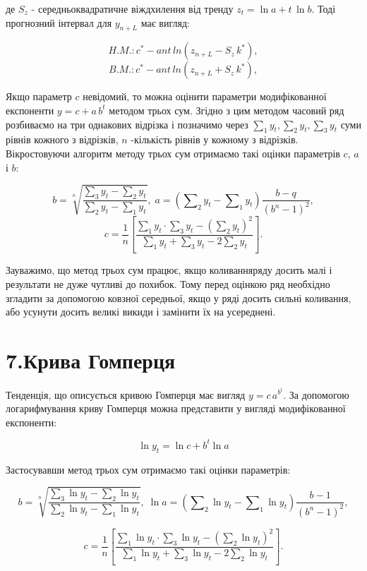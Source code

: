 \documentclass[a4paper, fontsize=10pt, oneside]{article}
\begin{document}
\noindent де $S_{z}$ - середньоквадратичне віждхилення від тренду $z_{t} = 	\ln{ a} + t\, \ln{b}.$
Тоді прогнозний інтервал для $y_{n+L}$ має вигляд:

$$H.M.: c^{*} - ant\,ln{(z_{n+L} - S_{z} \, k^{*})},$$
$$B.M.: c^{*} - ant\,ln{(z_{n+L} + S_{z} \, k^{*})},$$

Якщо параметр $c$ невідомий, то можна оцінити параметри модифікованної експоненти $y = c + a \, b^{t}$ методом трьох сум. Згідно з цим методом часовий ряд розбиваємо на три однакових відрізка і позначимо через $\sum_{1}y_{t}, \sum_{2}y_{t}, \sum_{3}y_{t}$ суми рівнів кожного з відрізків, $n$ -кількість рівнів у кожному з відрізків. Вікростовуючи алгоритм методу трьох сум отримаємо такі оцінки параметрів $c$, $a$ і $b$:

$$ b = \sqrt[n]{\frac{\sum_{3}y_{t} - \sum_{2}y_{t}}{\sum_{2}y_{t} - \sum_{1}y_{t}}},\; a = ( \sum\nolimits_{2} y_{t} - \sum\nolimits_{1} y_{t} ) \frac{b - q}{(b^{n} - 1)^2},$$
$$ c = \frac{1}{n} \left[ \frac{\sum_{1}y_{t} \cdot \sum_{3}y_{t} - (\sum_{2}y_{t})^2}{\sum_{1} y_{t} + \sum_{3} y_{t} - 2 \sum_{2}y_{t}} \right].$$

Зауважимо, що метод трьох сум працює, якщо коливанняряду досить малі і результати не дуже чутливі до похибок. Тому перед оцінкою ряд необхідно згладити за допомогою ковзної середньої, якщо у ряді досить сильні коливання, або усунути досить великі викиди і замінити їх на усереднені.

\chapter{\Large \bf 7.Крива Гомперця}

Тенденція, що описується кривою Гомперця має вигляд $y = c \, a^{b^{t}}.$ За допомогою логарифмування криву Гомперця можна представити у вигляді модифікованної експоненти:

$$\ln{y_{t}} = \ln{c} + b^{t} \ln{a}$$

Застосувавши метод трьох сум отримаємо такі оцінки параметрів:

$$b = \sqrt[n]{\frac{\sum_{3}\ln{y_{t}} - \sum_{2}\ln{y_{t}}}{\sum_{2}\ln{y_{t}} - \sum_{1}\ln{y_{t}}}}, \; \ln{a} = \left(\sum\nolimits_{2}\ln{y_{t}} - \sum\nolimits_{1}\ln{y_{t}}\right)\frac{b-1}{(b^{n} - 1)^2},$$

$$ c = \frac{1}{n} \left[ \frac{\sum_{1}\ln{y_{t}} \cdot \sum_{3}\ln{y_{t}} - (\sum_{2}\ln{y_{t}})^2}{\sum_{1} \ln{y_{t}} + \sum_{3} \ln{y_{t}} - 2 \sum_{2}\ln{y_{t}}} \right].$$
\end{document}
